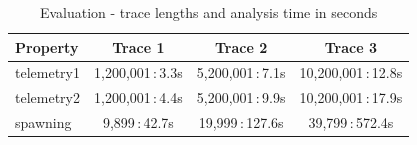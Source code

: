 

\begin{table}[h!]
\centering
\begin{tabular}{|l|c|c|c|}
\hline
Property   & Trace 1 & Trace 2 & Trace 3 \\
\hline
telemetry1 & 1,200,001\,:\,3.3s & 5,200,001\,:\,7.1s & 10,200,001\,:\,12.8s \\
\hline
telemetry2 & 1,200,001\,:\,4.4s & 5,200,001\,:\,9.9s & 10,200,001\,:\,17.9s \\
\hline
spawning   & 9,899\,:\,42.7s & 19,999\,:\,127.6s & 39,799\,:\,572.4s \\
\hline
\end{tabular}
\caption{Evaluation - trace lengths and analysis time in seconds}
\label{tab:evaluation}
\end{table}


